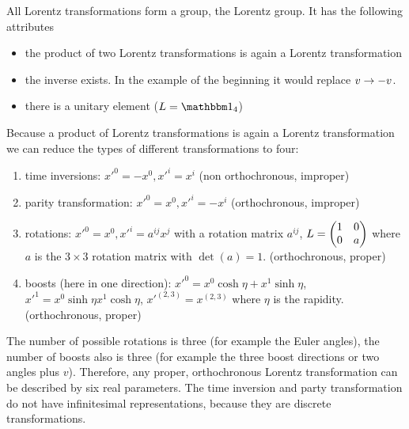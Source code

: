 All Lorentz transformations form a group, the Lorentz group. It has the following attributes
\begin{itemize}
\item the product of two Lorentz transformations is again a Lorentz transformation
\item the inverse exists. In the example of the beginning it would replace $v \rightarrow -v$.
\item there is a unitary element ($L = \ehm_4$)
\end{itemize}
Because a product of Lorentz transformations is again a Lorentz transformation we can reduce the types of different transformations to four:
\begin{enumerate}
\item time inversions: $x'^0 = - x^0, x'^i = x^i$ (non orthochronous, improper)
\item parity transformation: $x'^0 = x^0, x'^i = - x^i$ (orthochronous, improper)
\item rotations: $x'^0 = x^0, x'^i = a^{ij} x^j$ with a rotation matrix $a^{ij}$, $L = \begin{pmatrix}1&0\\0&a\end{pmatrix}$ where $a$ is the $3\times 3$ rotation matrix with $\det(a) = 1$. (orthochronous, proper)
\item boosts (here in one direction): $x'^0 = x^0 \cosh \eta + x^1 \sinh \eta$, $x'^1 = x^0 \sinh\eta x^1 \cosh\eta$, $x'^{(2,3)} = x^{(2,3)}$ where $\eta$ is the rapidity. (orthochronous, proper)
\end{enumerate}
The number of possible rotations is three (for example the Euler angles), the number of boosts also is three (for example the three boost directions or two angles plus $v$). Therefore, any proper, orthochronous Lorentz transformation can be described by six real parameters. The time inversion and party transformation do not have infinitesimal representations, because they are discrete transformations.

